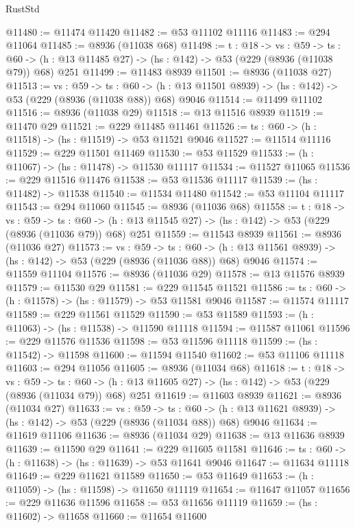\begin{lexlean}{RustStd}
\begin{coremodule}
@11480 := @11474 @11420
@11482 := @53 @11102 @11116
@11483 := @294 @11064
@11485 := @8936 (@11038 @68)
@11498 := {t : @18} ->
  {vs : @59} ->
  {ts : @60} -> (h : @13 @11485 @27) -> (hs : @142) -> @53 (@229 (@8936 (@11038 @79)) @68) @251
@11499 := @11483 @8939
@11501 := @8936 (@11038 @27)
@11513 := {vs : @59} ->
  {ts : @60} -> (h : @13 @11501 @8939) -> (hs : @142) -> @53 (@229 (@8936 (@11038 @88)) @68) @9046
@11514 := @11499 @11102
@11516 := @8936 (@11038 @29)
@11518 := @13 @11516 @8939
@11519 := @11470 @29
@11521 := @229 @11485 @11461
@11526 := {ts : @60} -> (h : @11518) -> (hs : @11519) -> @53 @11521 @9046
@11527 := @11514 @11116
@11529 := @229 @11501 @11469
@11530 := @53 @11529
@11533 := (h : @11067) -> (hs : @11478) -> @11530 @11117
@11534 := @11527 @11065
@11536 := @229 @11516 @11476
@11538 := @53 @11536 @11117
@11539 := (hs : @11482) -> @11538
@11540 := @11534 @11480
@11542 := @53 @11104 @11117
@11543 := @294 @11060
@11545 := @8936 (@11036 @68)
@11558 := {t : @18} ->
  {vs : @59} ->
  {ts : @60} -> (h : @13 @11545 @27) -> (hs : @142) -> @53 (@229 (@8936 (@11036 @79)) @68) @251
@11559 := @11543 @8939
@11561 := @8936 (@11036 @27)
@11573 := {vs : @59} ->
  {ts : @60} -> (h : @13 @11561 @8939) -> (hs : @142) -> @53 (@229 (@8936 (@11036 @88)) @68) @9046
@11574 := @11559 @11104
@11576 := @8936 (@11036 @29)
@11578 := @13 @11576 @8939
@11579 := @11530 @29
@11581 := @229 @11545 @11521
@11586 := {ts : @60} -> (h : @11578) -> (hs : @11579) -> @53 @11581 @9046
@11587 := @11574 @11117
@11589 := @229 @11561 @11529
@11590 := @53 @11589
@11593 := (h : @11063) -> (hs : @11538) -> @11590 @11118
@11594 := @11587 @11061
@11596 := @229 @11576 @11536
@11598 := @53 @11596 @11118
@11599 := (hs : @11542) -> @11598
@11600 := @11594 @11540
@11602 := @53 @11106 @11118
@11603 := @294 @11056
@11605 := @8936 (@11034 @68)
@11618 := {t : @18} ->
  {vs : @59} ->
  {ts : @60} -> (h : @13 @11605 @27) -> (hs : @142) -> @53 (@229 (@8936 (@11034 @79)) @68) @251
@11619 := @11603 @8939
@11621 := @8936 (@11034 @27)
@11633 := {vs : @59} ->
  {ts : @60} -> (h : @13 @11621 @8939) -> (hs : @142) -> @53 (@229 (@8936 (@11034 @88)) @68) @9046
@11634 := @11619 @11106
@11636 := @8936 (@11034 @29)
@11638 := @13 @11636 @8939
@11639 := @11590 @29
@11641 := @229 @11605 @11581
@11646 := {ts : @60} -> (h : @11638) -> (hs : @11639) -> @53 @11641 @9046
@11647 := @11634 @11118
@11649 := @229 @11621 @11589
@11650 := @53 @11649
@11653 := (h : @11059) -> (hs : @11598) -> @11650 @11119
@11654 := @11647 @11057
@11656 := @229 @11636 @11596
@11658 := @53 @11656 @11119
@11659 := (hs : @11602) -> @11658
@11660 := @11654 @11600

\end{coremodule}
\end{lexlean}
